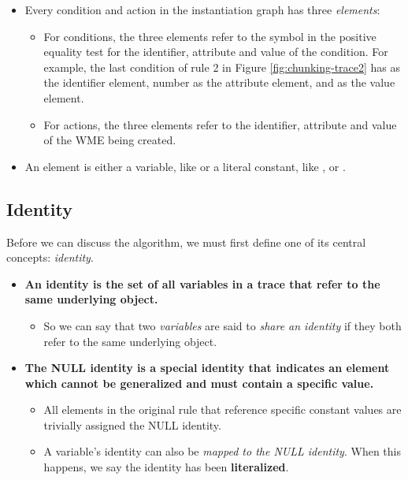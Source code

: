 \begin{itemize}
	\item Every condition and action in the instantiation graph has three \textit{elements}:

	\begin{itemize}
		\item For conditions, the three elements refer to the symbol in the positive equality test for the identifier, attribute and value of the condition.  For example, the last condition of rule 2 in Figure \ref{fig:chunking-trace2} has  as the identifier element, number as the attribute element, and  as the value element.

		\item For actions, the three elements refer to the identifier, attribute and value of the WME being created.
	\end{itemize}

	\item An element is either a variable, like    or a literal constant, like  ,    or   .

\end{itemize}

\subsection{Identity}

Before we can discuss the algorithm, we must first define one of its central concepts: \textit{identity}.

\begin{itemize}
	\item \textbf{An identity is the set of all variables in a trace that refer to the same underlying object.}
	\begin{itemize}
		\item So we can say that two \textit{variables} are said to \textit{share an identity} if they both refer to the same underlying object.
	\end{itemize}
	\item \textbf{The NULL identity is a special identity that indicates an element which cannot be generalized and must contain a specific value.}
	\begin{itemize}
		\item All elements in the original rule that reference specific constant values are trivially assigned the NULL identity.
		\item A variable's identity can also be \textit{mapped to the NULL identity}.  When this happens, we say the identity has been \textbf{literalized}.
	\end{itemize}
\end{itemize}

